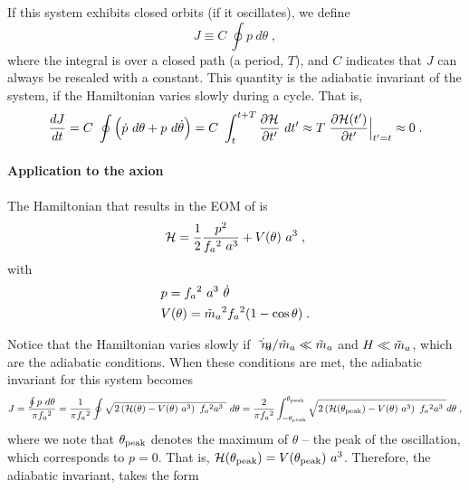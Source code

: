 \documentclass[11pt,a4paper]{article}
\begin{document}
If this system exhibits closed orbits (\eg if it oscillates), we define 
%
\begin{equation}
	J \equiv C \ \oint p \ d \theta \;,
	\label{eq:adiabatic_inv_def}
\end{equation}
%
where the integral is over a closed path (\eg a period, $T$), and $C$ indicates that $J$ can always be rescaled with a constant. This quantity is the adiabatic invariant of the system, if the Hamiltonian varies slowly during a cycle. That is,
%
\[
\dfrac{d J}{d t} = C \ \oint \lrBigb{\dot p \ d \theta + p \ d \dot \theta} = C \ \dint_{t}^{t+T}  \dfrac{\partial \Ham}{\partial t^\prime} \ d t^\prime \approx T \ \dfrac{\partial \Ham(t^{\prime})}{\partial t^{\prime}}\Big|_{t^{\prime}=t} \approx 0 
\;. 
\]
%




\paragraph{Application to the axion}
%
The Hamiltonian that results in the EOM of  is
%
\begin{equation}
	\mathcal{H} = \dfrac{1}{2} \dfrac{p^2}{f_{a}{}^2 \ a^3} + V(\theta) \ a^3\;,
	\label{eq:axion_H}
\end{equation}
%
with 
%
\begin{eqnarray}
	& p = f_{a}{}^2 \ a^3 \ \dot \theta \\
	\label{eq:momentum}
	& V(\theta) = \tilde m_{a}{}^2 f_{a}{}^2 (1-\cos \theta) \;.
	\label{eq:potential}
\end{eqnarray}

Notice that the Hamiltonian varies slowly if $\dot {\tilde m_{a}{}}/\tilde m_{a}{} \ll \tilde m_{a}{}$ and $H \ll \tilde m_{a}{}$, which are the adiabatic conditions.  When these conditions are met, the adiabatic invariant for this system becomes
%
\begin{equation}
	J = \dfrac{\oint p \ d \theta}{\pi f_{a}{}^2} = \dfrac{1}{\pi f_{a}{}^2} \oint \sqrt{ 2\left(  \mathcal{H}(\theta) - V(\theta) \ a^3 \right) \ f_{a}{}^2 a^3 \ }  \ d \theta  =
	 \dfrac{2}{\pi f_{a}{}^2} \int_{-\theta_{\rm peak}{}}^{\theta_{\rm peak}{}} \sqrt{ 2\left(  \mathcal{H}(\theta_{\rm peak}{}) - V(\theta) \ a^3 \right) \ f_{a}{}^2 a^3 \ } d \theta \;,
	 \label{eq:J_axion_definition}
\end{equation}
%
where we note that $\theta_{\rm peak}{}$ denotes the maximum of $\theta$ -- the peak of the oscillation, which corresponds to $p=0$. That is, $\Ham(\thetamax) = V(\thetamax) \ a^3$. Therefore, the adiabatic invariant, takes the form 
\end{document}
